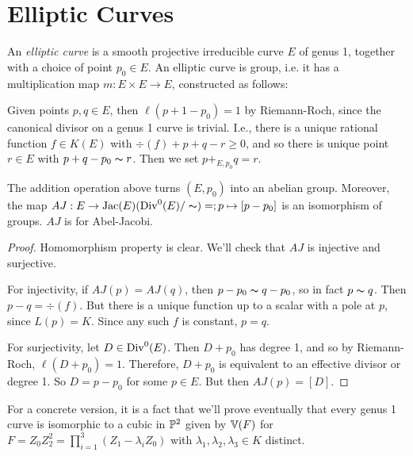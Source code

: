 \documentclass[10pt,a4paper,rgb]{article}
\begin{document}
\section{Elliptic Curves}
An \emph{elliptic curve} is a smooth projective irreducible curve $E$ of genus 1, together with a choice of point $p_0 \in E$. An elliptic curve is group, i.e. it has a multiplication map $m: E \times E \to E$, constructed as follows:

Given points $p,q \in E$, then $\ell(p+1-p_0) = 1$ by Riemann-Roch, since the canonical divisor on a genus 1 curve is trivial. I.e., there is a unique rational function $f \in K(E)$ with $\div(f) + p + q - r \geq 0$, and so there is unique point $r \in E$ with $p+q-p_0 \thicksim r$. Then we set $p +_{E, p_0} q = r$.

\begin{theorem}
The addition operation above turns $(E,p_0)$ into an abelian group. Moreover, the map $AJ:E \to \Jac(E) (\Div^0(E)/\thicksim)=; p \mapsto [p-p_0]$ is an isomorphism of groups. $AJ$ is for Abel-Jacobi.
\end{theorem}
\begin{proof}
Homomorphism property is clear. We'll check that $AJ$ is injective and surjective.

For injectivity, if $AJ(p) = AJ(q)$, then $p-p_0 \thicksim q-p_0$, so in fact $p \thicksim q$. Then $p-q = \div(f)$. But there is a unique function up to a scalar with a pole at $p$, since $L(p) = K$. Since any such $f$ is constant, $p=q$.

For surjectivity, let $D \in \Div^0(E)$. Then $D+p_0$ has degree 1, and so by Riemann-Roch, $\ell(D+p_0) = 1$. Therefore, $D+p_0$ is equivalent to an effective divisor or degree 1. So $D = p-p_0$ for some $p \in E$. But then $AJ(p) = [D]$.
\end{proof}
For a concrete version, it is a fact that we'll prove eventually that every genus 1 curve is isomorphic to a cubic in $\P^2$ given by $\V(F)$ for $F = Z_0Z_2^2 = \prod_{i=1}^3(Z_1-\lambda_i Z_0)$ with $\lambda_1, \lambda_2, \lambda_3 \in K$ distinct.
\end{document}

